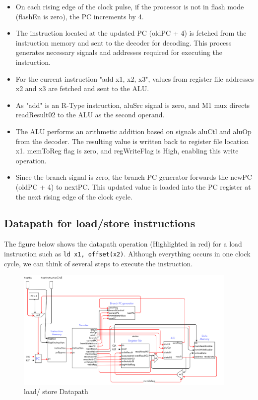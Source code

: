 \begin{itemize}
  \item On each rising edge of the clock pulse, if the processor is not in flash mode (flashEn is zero), the PC increments by 4.
  \item The instruction located at the updated PC (oldPC + 4) is fetched from the instruction memory and sent to the decoder for decoding. This process generates necessary signals and addresses required for executing the instruction.
  \item  For the current instruction "add x1, x2, x3", values from register file addresses x2 and x3 are fetched and sent to the ALU.

  \item  As "add" is an R-Type instruction, aluSrc signal is zero, and M1 mux directs readResult02 to the ALU as the second operand.
  \item The ALU performs an arithmetic addition based on signals aluCtl and aluOp from the decoder. The resulting value is written back to register file location x1. memToReg flag is zero, and regWriteFlag is High, enabling this write operation.

  \item Since the branch signal is zero, the branch PC generator forwards the newPC (oldPC + 4) to nextPC. This updated value is loaded into the PC register at the next rising edge of the clock cycle.
\end{itemize}


\subsection{Datapath for load/store instructions}

The figure below shows the datapath operation (Highlighted in red) for a load instruction such as \texttt{ld x1, offset(x2)}. Although everything occurs in one clock cycle, we can think of several steps to execute the instruction.

\begin{figure}[H]
    \centering
    \includegraphics[width=0.95\textwidth, height=0.4\textheight]{Image/02_load.png}
    \caption{load/ store Datapath}
    \label{fig:load/ store Datapath}
\end{figure}

